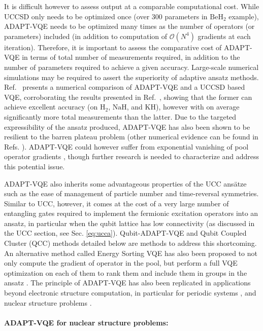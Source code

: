 It is difficult however to assess output at a comparable computational cost. While UCCSD only needs to be optimized once (over 300 parameters in $\mathrm{BeH_2}$ example), ADAPT-VQE needs to be optimized many times as the number of operators (or parameters) included (in addition to computation of $\mathcal{O}(N^4)$ gradients at each iteration). Therefore, it is important to assess the comparative cost of ADAPT-VQE in terms of total number of measurements required, in addition to the number of parameters required to achieve a given accuracy.
Large-scale numerical simulations may be required to assert the superiority of adaptive ansatz methods. Ref.~ \cite{Claudino2020} presents a numerical comparison of ADAPT-VQE and a UCCSD based VQE, corroborating the results presented in Ref.~\cite{Grimsley2019}, showing that the former can achieve excellent accuracy (on $\mathrm{H_2}$, $\mathrm{NaH}$, and $\mathrm{KH}$), however with on average significantly more total measurements than the latter. Due to the targeted expressibility of the ansatz produced, ADAPT-VQE has also been shown to be resilient to the barren plateau problem \cite{Grimsley2022} (other numerical evidence can be found in Refs. \cite{Skolik2021, Bilkis2021}). ADAPT-VQE could however suffer from exponential vanishing of pool operator gradients \cite{Grimsley2022}, though further research is needed to characterize and address this potential issue.  

ADAPT-VQE also inherits some advantageous properties of the UCC ans{\"{a}}tze such as the ease of management of particle number and time-reversal symmetries. Similar to UCC, however, it comes at the cost of a very large number of entangling gates required to implement the fermionic excitation operators into an ansatz, in particular when the qubit lattice has low connectivity (as discussed in the UCC section, see Sec. \ref{eq:ucca}). Qubit-ADAPT-VQE \cite{Tang2021} and Qubit Coupled Cluster (QCC) \cite{Ryabinkin2018} methods detailed below are methods to address this shortcoming. An alternative method called Energy Sorting VQE has also been proposed to not only compute the gradient of operator in the pool, but perform a full VQE optimization on each of them to rank them and include them in groups in the ansatz \cite{Fan2021}.
The principle of ADAPT-VQE has also been replicated in applications beyond electronic structure computation, in particular for periodic systems \cite{Liu2020}, and nuclear structure problems \cite{Romero2022}.

\paragraph{ADAPT-VQE for nuclear structure problems:}

